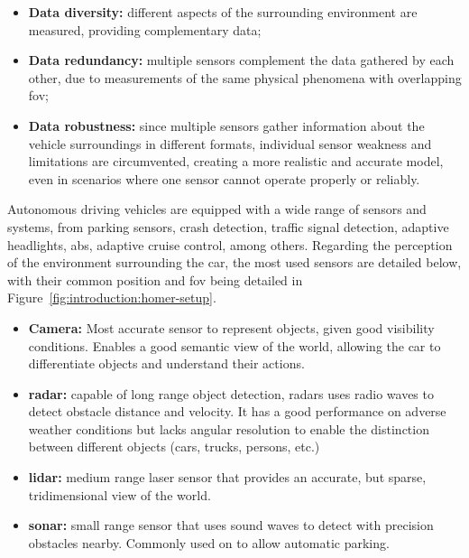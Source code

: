 \begin{itemize}
	\item \textbf{Data diversity:} different aspects of the surrounding environment are measured, providing complementary data;
	\item \textbf{Data redundancy:} multiple sensors complement the data gathered by each other, due to measurements of the same physical phenomena with overlapping \ac{fov};
	\item \textbf{Data robustness:} since multiple sensors gather information about the vehicle surroundings in different formats, individual sensor weakness and limitations are circumvented, creating a more realistic and accurate model, even in scenarios where one sensor cannot operate properly or reliably.
\end{itemize}

Autonomous driving vehicles are equipped with a wide range of sensors and systems, from parking sensors, crash detection, traffic signal detection, adaptive headlights, \ac{abs}, adaptive cruise control, among others. Regarding the perception of the environment surrounding the car, the most used sensors are detailed below, with their common position and \ac{fov} being detailed in Figure~\ref{fig:introduction:homer-setup}.

\begin{itemize}
	\item \textbf{Camera:} Most accurate sensor to represent objects, given good visibility conditions. Enables a good semantic view of the world, allowing the car to differentiate objects and understand their actions.  
	\item \textbf{\ac{radar}:} capable of long range object detection, \acp{radar} uses radio waves to detect obstacle distance and velocity. It has a good performance on adverse weather conditions but lacks angular resolution to enable the distinction between different objects (cars, trucks, persons, etc.)
	\item \textbf{\ac{lidar}:} medium range laser sensor that provides an accurate, but sparse, tridimensional view of the world.
	\item \textbf{\ac{sonar}:} small range sensor that uses sound waves to detect with precision obstacles nearby. Commonly used on to allow automatic parking. 
\end{itemize}

